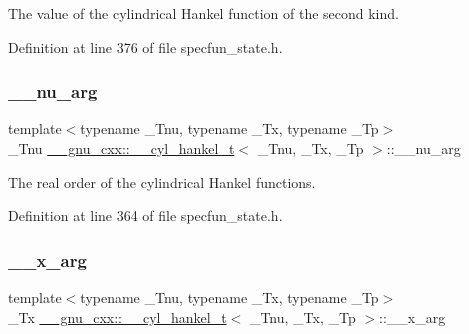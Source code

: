 The value of the cylindrical Hankel function of the second kind. 



Definition at line 376 of file specfun\+\_\+state.\+h.

\mbox{\label{struct____gnu__cxx_1_1____cyl__hankel__t_a67499e047360bcfc7c84f0e3c1d36dab}} 
\subsubsection{\texorpdfstring{\+\_\+\+\_\+nu\+\_\+arg}{\_\_nu\_arg}}
{\footnotesize\ttfamily template$<$typename \+\_\+\+Tnu, typename \+\_\+\+Tx, typename \+\_\+\+Tp$>$ \\
\+\_\+\+Tnu \hyperlink{struct____gnu__cxx_1_1____cyl__hankel__t}{\+\_\+\+\_\+gnu\+\_\+cxx\+::\+\_\+\+\_\+cyl\+\_\+hankel\+\_\+t}$<$ \+\_\+\+Tnu, \+\_\+\+Tx, \+\_\+\+Tp $>$\+::\+\_\+\+\_\+nu\+\_\+arg}



The real order of the cylindrical Hankel functions. 



Definition at line 364 of file specfun\+\_\+state.\+h.

\mbox{\label{struct____gnu__cxx_1_1____cyl__hankel__t_a7b1009ea94ea381fcae13abc9da8b9c6}} 
\subsubsection{\texorpdfstring{\+\_\+\+\_\+x\+\_\+arg}{\_\_x\_arg}}
{\footnotesize\ttfamily template$<$typename \+\_\+\+Tnu, typename \+\_\+\+Tx, typename \+\_\+\+Tp$>$ \\
\+\_\+\+Tx \hyperlink{struct____gnu__cxx_1_1____cyl__hankel__t}{\+\_\+\+\_\+gnu\+\_\+cxx\+::\+\_\+\+\_\+cyl\+\_\+hankel\+\_\+t}$<$ \+\_\+\+Tnu, \+\_\+\+Tx, \+\_\+\+Tp $>$\+::\+\_\+\+\_\+x\+\_\+arg}



